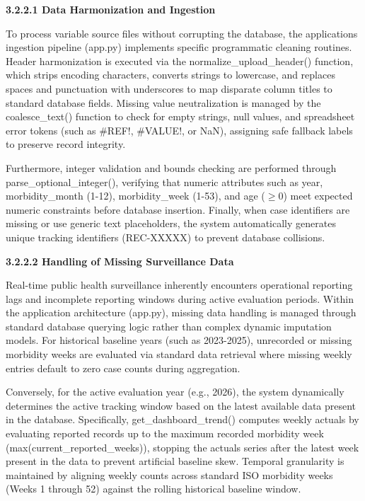 \documentclass[
]{article}
\begin{document}
\textbf{3.2.2.1 Data Harmonization and Ingestion}

To process variable source files without corrupting the database, the
application\textquotesingle s ingestion pipeline (app.py) implements
specific programmatic cleaning routines. Header harmonization is
executed via the normalize\_upload\_header() function, which strips
encoding characters, converts strings to lowercase, and replaces spaces
and punctuation with underscores to map disparate column titles to
standard database fields. Missing value neutralization is managed by the
coalesce\_text() function to check for empty strings, null values, and
spreadsheet error tokens (such as \#REF!, \#VALUE!, or NaN), assigning
safe fallback labels to preserve record integrity.

Furthermore, integer validation and bounds checking are performed
through parse\_optional\_integer(), verifying that numeric attributes
such as year, morbidity\_month (1-12), morbidity\_week (1-53), and age
(\(\geq 0\)) meet expected numeric constraints before database
insertion. Finally, when case identifiers are missing or use generic
text placeholders, the system automatically generates unique tracking
identifiers (REC-XXXXX) to prevent database collisions.

\textbf{3.2.2.2 Handling of Missing Surveillance Data}

Real-time public health surveillance inherently encounters operational
reporting lags and incomplete reporting windows during active evaluation
periods. Within the application architecture (app.py), missing data
handling is managed through standard database querying logic rather than
complex dynamic imputation models. For historical baseline years (such
as 2023-2025), unrecorded or missing morbidity weeks are evaluated via
standard data retrieval where missing weekly entries default to zero
case counts during aggregation.

Conversely, for the active evaluation year (e.g., 2026), the system
dynamically determines the active tracking window based on the latest
available data present in the database. Specifically,
get\_dashboard\_trend() computes weekly actuals by evaluating reported
records up to the maximum recorded morbidity week
(max(current\_reported\_weeks)), stopping the actuals series after the
latest week present in the data to prevent artificial baseline skew.
Temporal granularity is maintained by aligning weekly counts across
standard ISO morbidity weeks (Weeks 1 through 52) against the rolling
historical baseline window.
\end{document}
